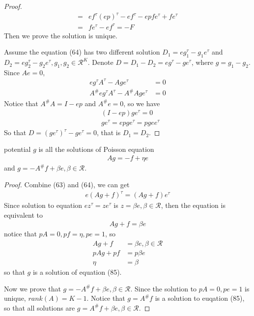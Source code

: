 \documentclass[runningheads]{llncs}
\begin{document}
\begin{proof}
\begin{align}
            = &ef^\tau(ep)^\tau - ef^\tau - epfe^\tau + fe^\tau \\
            = &fe^\tau - ef^\tau = -F
        \end{align}
        Then we prove the solution is unique.
        \par
        Assume the equation (64) has two different solution
        $D_1 = eg_1^\tau - g_1e^\tau$ and $D_2 = eg_2^\tau - g_2e^\tau, g_1, g_2 \in \mathcal{R}^K$.
        Denote $D = D_1 - D_2 = eg^\tau - ge^\tau$, where $g = g_1 - g_2$.
        Since $Ae = 0$, 
        \begin{align}
            eg^\tau A^\tau - Age^\tau &= 0 \\
            A^\# eg^\tau A^\tau - A^\# Age^\tau &= 0
        \end{align}
        Notice that $A^\# A = I - ep$ and $A^\# e = 0$,
        so we have
        \begin{align}
            &(I - ep) ge^\tau = 0 \\
            &ge^\tau = epge^\tau = pg ee^\tau
        \end{align}
        So that $D = (ge^\tau)^\tau - ge^\tau = 0$, that is $D_1 = D_2$.
    \end{proof}
    \begin{lemma}
        potential $g$ is all the solutions of Poisson equation
        \begin{align}
            Ag = -f + \eta e
        \end{align}
        and $g = -A^\# f + \beta e, \beta \in \mathcal{R}$.
    \end{lemma}
    \begin{proof}
        Combine (63) and (64), we can get
        \begin{align}
            e(Ag + f)^\tau = (Ag + f)e^\tau
        \end{align}
        Since solution to equation $ez^\tau = ze^\tau$ is $z = \beta e, \beta \in \mathcal{R}$,
        then the equation is equivalent to 
        \begin{align}
            Ag + f = \beta e
        \end{align}
        notice that $pA = 0, pf = \eta, pe = 1$, so
        \begin{align}
            Ag + f &= \beta e, \beta \in \mathcal{R} \\
            pAg + pf &= p\beta e \\
            \eta &= \beta
        \end{align}
        so that $g$ is a solution of equation (85).
        \par
        Now we prove that $g = -A^\# f + \beta e, \beta \in \mathcal{R}$.
        Since the solution to $pA = 0, pe = 1$ is unique,
        $rank(A) = K - 1$. Notice that $g = A^\# f$ is a solution
        to euqation (85), so that all solutions are
        $g = A^\# f + \beta e, \beta \in \mathcal{R}$.
    \end{proof}
\end{document}
